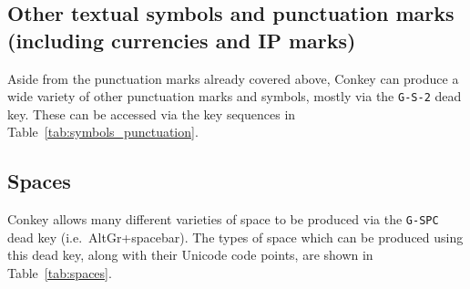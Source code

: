\documentclass[oneside]{memoir}
\newcommand{\key}{\verb}
\begin{document}
\subsection{Other textual symbols and punctuation marks (including currencies and IP marks)}
\label{sec:symbols_punctuation}

Aside from the punctuation marks already covered above,
  Conkey can produce a wide variety of other punctuation marks and symbols,
  mostly via the \key|G-S-2| dead key.
These can be accessed via the key sequences in Table~\ref{tab:symbols_punctuation}.

\subsection{Spaces}
\label{sec:spaces}

Conkey allows many different varieties of space to be produced via the \key|G-SPC| dead key
  (i.e.\ AltGr+spacebar).
The types of space which can be produced using this dead key,
  along with their Unicode code points,
  are shown in Table~\ref{tab:spaces}.
\end{document}
